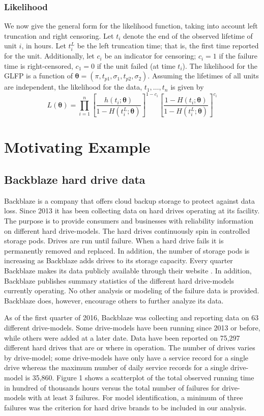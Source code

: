 \documentclass[aoas]{imsart}
\begin{document}
\subsubsection{Likelihood}
We now give the general form for the likelihood function, taking into account left truncation and right censoring.  Let $t_{i}$ denote the end of the observed lifetime of unit $i$, in hours.  Let $t_i^L$ be the left truncation time; that is, the first time reported for the unit.  Additionally, let $c_i$ be an indicator for censoring; $c_i=1$ if the failure time is right-censored, $c_1=0$ if the unit failed (at time $t_i$). The likelihood for the GLFP is a function of $\bm{\theta} = (\pi,t_{p1}, \sigma_1, t_{p2}, \sigma_2)$.  Assuming the lifetimes of all units are independent, the likelihood for the data, $t_1,\ldots,t_n$ is given by
\begin{equation*}
L(\bm{\theta})= \prod_{i=1}^{n} \left[\frac{h(t_i;\bm{\theta})}{1-H(t_i^L;\bm{\theta})}\right]^{1-c_i} \left[ \frac{1-H(t_i;\bm{\theta})}{1-H(t_i^L;\bm{\theta})} \right]^{c_i}
\end{equation*}

\section{Motivating Example}
\label{sec:Data}
\subsection{Backblaze hard drive data}
Backblaze is a company that offers cloud backup storage to protect against data loss.  Since 2013 it has been collecting data on hard drives operating at its facility.  The purpose is to provide consumers and businesses with reliability information on different hard drive-models.  The hard drives continuously spin in controlled storage pods.  Drives are run until failure.  When a hard drive fails it is permanently removed and replaced.  In addition, the number of storage pods is increasing as Backblaze adds drives to its storage capacity.  Every quarter Backblaze makes its data publicly available through their website \citep{backblaze}. In addition, Backblaze publishes summary statistics of the different hard drive-models currently operating.  No other analysis or modeling of the failure data is provided.  Backblaze does, however, encourage others to further analyze its data. 

As of the first quarter of 2016, Backblaze was collecting and reporting data on 63 different drive-models.  Some drive-models have been running since 2013 or before, while others were added at a later date.  Data have been reported on 75,297 different hard drives that are or where in operation.  The number of drives varies by drive-model; some drive-models have only have a service record for a single drive whereas the maximum number of daily service records for a single drive-model is 35,860.  Figure 1 shows a scatterplot of the total observed running time in hundred of thousands hours versus the total number of failures for drive-models with at least 3 failures.  For model identification, a minimum of three failures was the criterion for hard drive brands to be included in our analysis.  
\end{document}

